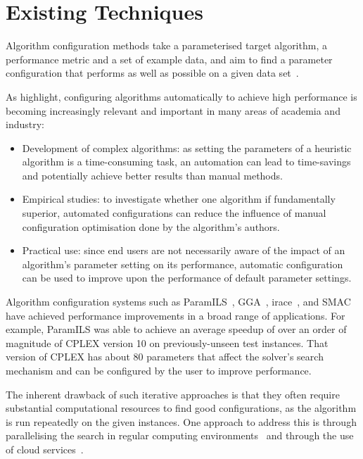\documentclass{article}
\begin{document}
\section{Existing Techniques}\label{sec:previous}

Algorithm configuration methods take a parameterised target algorithm, a performance metric and a set of example data, and aim to find a parameter configuration that performs as well as possible on a given data set~\cite{Geschwender2014cloud}. 

As \citet{DBLP:journals/jair/HutterHLS09} highlight, configuring algorithms automatically to achieve high performance is becoming increasingly relevant and important in many areas of academia and industry:

\begin{itemize}
	\item Development of complex algorithms: as setting the parameters of a heuristic algorithm is a time-consuming task, an automation can lead to time-savings and potentially achieve better results than manual methods.
	\item Empirical studies: to investigate whether one algorithm if fundamentally superior, automated configurations can reduce the influence of manual configuration optimisation done by the algorithm's authors.
	\item Practical use: since end users are not necessarily aware of the impact of an algorithm's parameter setting on its performance, automatic configuration can be used to improve upon the performance of default parameter settings.
\end{itemize}

Algorithm configuration systems such as ParamILS~\cite{DBLP:journals/jair/HutterHLS09}, GGA~\cite{Ansotegui2009genderbasedga}, irace~\cite{Birattari2010irace}, and SMAC~\cite{Hutter2011smac} have achieved performance improvements in a broad range of applications. For example, ParamILS was able to achieve an average speedup of over an order of magnitude of CPLEX version 10 on previously-unseen test instances. That version of CPLEX has about 80 parameters that affect the solver’s search mechanism and can be configured by the user to improve performance. 

The inherent drawback of such iterative approaches is that they often require substantial computational resources to find good configurations, as the algorithm is run repeatedly on the given instances.  
One approach to address this is through parallelising the search in regular computing environments~\cite{Hutter2012parallel} and through the use of cloud services~\cite{Geschwender2014cloud}. 
\end{document}
